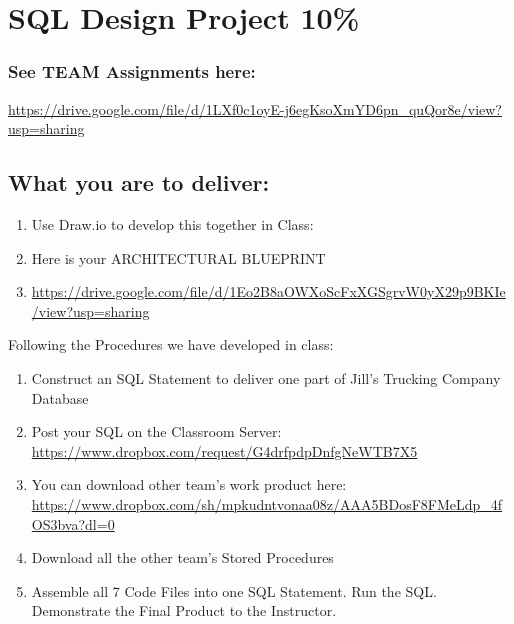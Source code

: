 
\section{SQL Design Project 10\%}

\subsubsection{See TEAM Assignments here:}
\url{https://drive.google.com/file/d/1LXf0c1oyE-j6egKsoXmYD6pn_quQor8e/view?usp=sharing}

\subsection{What you are to deliver:}


\begin{enumerate}
\item Use Draw.io to develop this together in Class: 
\item Here is your ARCHITECTURAL BLUEPRINT 
\item \url{https://drive.google.com/file/d/1Eo2B8aOWXoScFxXGSgrvW0yX29p9BKIe/view?usp=sharing}
\end{enumerate}

\vspace{.5cm}
Following the Procedures we have developed in class:
\begin{enumerate}
    \item Construct an SQL Statement to deliver one part of Jill's Trucking Company Database
    \item Post your SQL on the Classroom Server: 
    \url{https://www.dropbox.com/request/G4drfpdpDnfgNeWTB7X5}
    \item You can download other team's work product here: 
    \url{https://www.dropbox.com/sh/mpkudntvonaa08z/AAA5BDosF8FMeLdp_4fOS3bva?dl=0}
    \item Download all the other team's Stored Procedures
    \item Assemble all 7 Code Files into one SQL Statement. Run the SQL. Demonstrate the Final Product to the Instructor.
\end{enumerate}

